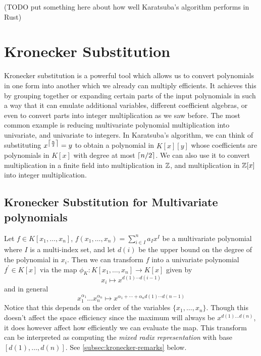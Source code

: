 \medskip

(TODO put something here about how well Karatsuba's algorithm performs in Rust)

\medskip

\section{Kronecker Substitution}%
\label{sub:kronecker_substitution}

Kronecker substitution is a powerful tool which allows us to convert polynomials in one form into another which we already can multiply efficients. It achieves this by grouping together or expanding certain parts of the input polynomials in such a way that it can emulate additional variables, different coefficient algebras, or even to convert parts into integer multiplication as we saw before. The most common example is reducing multivariate polynomial multiplication into univariate, and univariate to integers. In Karatsuba's algorithm, we can think of substituting $x^{\left \lceil \frac{n}{2} \right \rceil} = y$ to obtain a polynomial in $K[x][y]$ whose coefficients are polynomials in $K[x]$ with degree at most $\left \lceil n/2 \right \rceil$. We can also use it to convert multiplication in a finite field into multiplication in ${\mathbb Z}$, and multiplication in ${\mathbb Z}[x]$ into integer multiplication.

\medskip 

\subsection{Kronecker Substitution for Multivariate polynomials}

Let $f \in K[x_1, \ldots, x_n]$, $f(x_1, \ldots, x_n) = \sum^n_{i \in I}a_Ix^I$ be a multivariate polynomial where $I$ is a multi-index set, and let $d(i)$ be the upper bound on the degree of the polynomial in $x_i$. Then we can transform $f$ into a univariate polynomial $f^\prime \in K[x]$ via the map $\phi_K: K[x_1, \ldots, x_n] \to K[x]$ given by
\[
    x_i \mapsto x^{d(1) \cdots d(i-1)}
\]
and in general
\[
    x_1^{\alpha_1}\ldots x_n^{\alpha_n} \mapsto x^{\alpha_1 + \cdots + \alpha_n d(1) \cdots d(n-1)}
\]
Notice that this depends on the order of the variables $\{x_1, \ldots, x_n\}$. Though this doesn't affect the space efficiency since the maximum will always be $x^{d(1)\ldots d(n)}$, it does however affect how efficiently we can evaluate the map.  This transform can be interpreted as computing the \emph{mixed radix representation} with base $[d(1), \ldots, d(n)]$. See \ref{subsec:kronecker-remarks} below.

